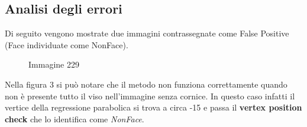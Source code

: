 \documentclass[
  italian,
]{article}
\begin{document}
\hypertarget{Analisi degli errori}{%
\subsection{Analisi degli errori}\label{Analisi degli errori}}

Di seguito vengono mostrate due immagini contrassegnate come False Positive (Face individuate come NonFace).

\begin{figure}
\centering
{}%
\qquad
{}%
\qquad
{}%
\caption{Immagine 229}
\end{figure}
Nella figura 3 si può notare che il metodo non funziona correttamente quando non è presente tutto il viso nell'immagine senza cornice.\newline
In questo caso infatti il vertice della regressione parabolica si trova a circa -15 e passa il \textbf{vertex position check}  che lo identifica come \emph{NonFace}.
\end{document}
